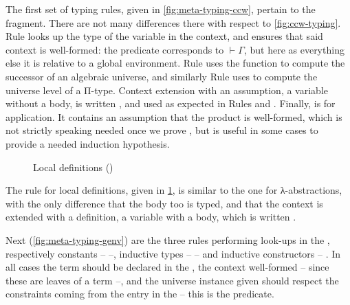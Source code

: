 The first set of typing rules, given in \cref{fig:meta-typing-ccw},
pertain to the  fragment. There are not many differences
there with respect to \cref{fig:ccw-typing}. Rule  looks up the type of the
variable in the context, and ensures that said context is well-formed:
the  predicate corresponds to $\vdash \Gamma$,
but here as everything else it is relative to a global environment.
Rule  uses the  function to compute
the successor of an algebraic universe, and similarly Rule  uses
 to compute the universe level of a Π-type.%
Context extension with an assumption, \ie a variable without a body,
is written , and used as expected in Rules 
and . Finally,  is for application. It contains an
assumption that the product is well-formed, which is not strictly speaking needed once we
prove , but is useful in some cases to provide a needed induction hypothesis.

\begin{figure}
  \ContinuedFloat
  \caption{Local definitions ()}
  \label{fig:meta-typing-letin}
\end{figure}

The rule for local definitions, given in \cref{fig:meta-typing-letin}, is similar to the one
for λ-abstractions, with the only difference that the body too is typed, and that the context
is extended with a definition, \ie a variable with a body, which is written .

\begin{figure*}
  \ContinuedFloat
  \caption{Globally defined terms ()}
  \label{fig:meta-typing-genv}
\end{figure*}

Next (\cref{fig:meta-typing-genv}) are the three rules performing look-ups in
the , respectively constants –  –, inductive types –
 – and inductive constructors – . In all cases the
term should be declared in the , the context well-formed
– since these are leaves of a term –,
and the universe instance given should respect the constraints coming from the
entry in the  – this is the
 predicate.

